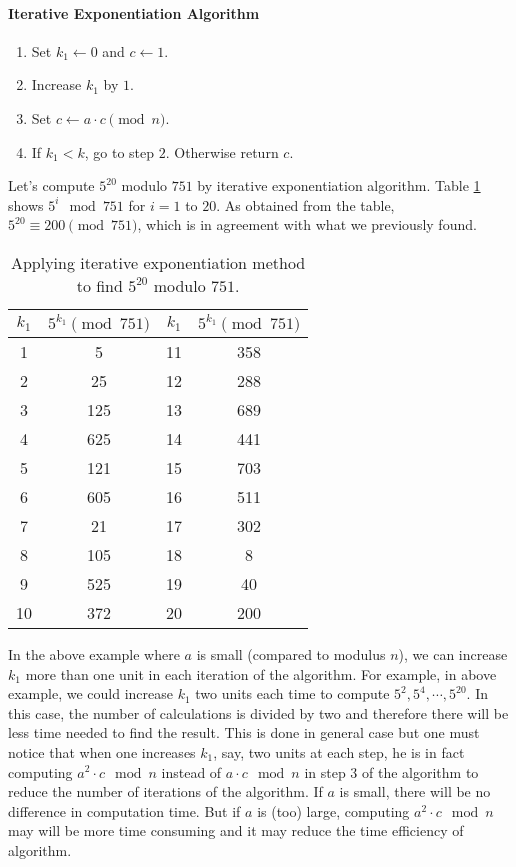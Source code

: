 \paragraph{Iterative Exponentiation Algorithm}
\begin{enumerate}[1.]
	\item Set $k_1 \longleftarrow 0$ and $c \longleftarrow 1$.
	\item Increase $k_1$ by $1$.
	\item Set $c \longleftarrow a \cdot c \pmod n$.
	\item If $k_1<k$, go to step $2$. Otherwise return $c$.
\end{enumerate}

\begin{example}
	Let's compute $5^{20}$ modulo $751$ by iterative exponentiation algorithm. Table \ref{table:modmult} shows $5^i \mod{751}$ for $i=1$ to $20$. As obtained from the table, $5^{20} \equiv 200 \pmod{751}$, which is in agreement with what we previously found.
	\begin{table}
		\centering
		\begin{tabular}{|c|c|c|c|}
			\hline
			$k_1$ & $5^{k_1} \pmod{751}$ & $k_1$ & $5^{k_1} \pmod{751}$ \\
			\hline
			1 & 5 & 11 & 358  \\
			\hline
			2 & 25 & 12 & 288 \\
			\hline
			3 & 125 & 13 & 689 \\
			\hline
			4 & 625 & 14 & 441  \\
			\hline
			5 & 121 & 15 & 703 \\
			\hline
			6 & 605 & 16 & 511 \\
			\hline
			7 & 21 & 17 & 302 \\
			\hline
			8 & 105 & 18 & 8 \\
			\hline
			9 & 525 & 19 & 40 \\
			\hline
			10 & 372 & 20 & 200 \\
			\hline
		\end{tabular}
		\caption{Applying iterative exponentiation method to find $5^{20}$ modulo $751$.}
		\label{table:modmult}
	\end{table}
\end{example}

\begin{remark}
	In the above example where $a$ is small (compared to modulus $n$), we can increase $k_1$ more than one unit in each iteration of the algorithm. For example, in above example, we could increase $k_1$ two units each time to compute $5^2, 5^4,\cdots, 5^{20}$. In this case, the number of calculations is divided by two and therefore there will be less time needed to find the result. This is done in general case but one must notice that when one increases $k_1$, say, two units at each step, he is in fact computing $a^2 \cdot c \mod n$ instead of $a \cdot c \mod n$ in step $3$ of the algorithm to reduce the number of iterations of the algorithm. If $a$ is small, there will be no difference in computation time. But if $a$ is (too) large, computing $a^2 \cdot c \mod n$ may will be more time consuming and it may reduce the time efficiency of algorithm.
\end{remark}

